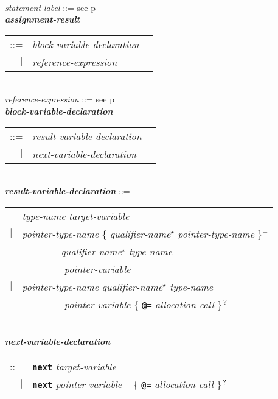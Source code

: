 \documentclass[12pt]{article}
\newcommand{\TT}[1]{{\tt \bfseries #1}}
\newcommand{\STAR}{{\Large $^\star$}}
\newcommand{\PLUS}[1][]{{$^{+#1}$}}
\newcommand{\QMARK}{{$^{\,\mbox{\footnotesize ?}}$}}
\newcommand{\ttkey}[1]{{\tt \bfseries #1}}
\newcommand{\emkey}[1]{{\em \bfseries #1}}
\newcommand{\pagref}[1]{p\pageref{#1}}
\newenvironment{indpar}[1][0.3in]%
	{\begin{list}{}%
		     {\setlength{\itemsep}{0in}%
		      \setlength{\topsep}{0in}%
		      \setlength{\parsep}{1ex}%
		      \setlength{\labelwidth}{#1}%
		      \setlength{\leftmargin}{#1}%
		      \addtolength{\leftmargin}{\labelsep}}%
	 \item}%
	{\end{list}}
\begin{document}
\begin{indpar}
\\[0.5ex]
{\em statement-label} ::= see \pagref{STATEMENT-LABEL}
\\[0.5ex]
\emkey{assignment-result}\label{ASSIGNMENT-RESULT}
    \begin{tabular}[t]{@{}rll}
    ::= & {\em block-variable-declaration} \\
    $|$ & {\em reference-expression}
    \end{tabular}
\\[0.5ex]
{\em reference-expression} ::= see \pagref{REFERENCE-EXPRESSIONS}
\\[0.5ex]
\emkey{block-variable-declaration}\label{BLOCK-VARIABLE-DECLARATION}
    \begin{tabular}[t]{@{}rll}
    ::= & {\em result-variable-declaration} \\
    $|$ & {\em next-variable-declaration} \\
    \end{tabular}
\\[0.5ex]
\emkey{result-variable-declaration}\label{RESULT-VARIABLE-DECLARATION} ::= \\
\hspace*{0.5in}\begin{tabular}{rl}
	    & {\em type-name} {\em target-variable} \\
	$|$ & {\em pointer-type-name}
	      \{ {\em qualifier-name}\STAR{} {\em pointer-type-name} \}\PLUS{}
	      \\
	    & ~~~~~~~~{\em qualifier-name}\STAR{} {\em type-name} \\
	    & ~~~~~~~~ {\em pointer-variable} \\
	$|$ & {\em pointer-type-name}
	      {\em qualifier-name}\STAR{} {\em type-name} \\
	    & ~~~~~~~~ {\em pointer-variable}
	               \{ \TT{@=} {\em allocation-call} \}\QMARK{} \\
	\end{tabular}
\\[0.5ex]
\emkey{next-variable-declaration}\label{NEXT-VARIABLE-DECLARATION} \\
\hspace*{0.5in}\begin{tabular}{rl}
      ::= & \ttkey{next} {\em target-variable} \\
      $|$ & \ttkey{next} {\em pointer-variable}
	      ~ \{ \TT{@=} {\em allocation-call} \}\QMARK{} \\
      \end{tabular}
\\[0.5ex]

\end{indpar}
\end{document}
